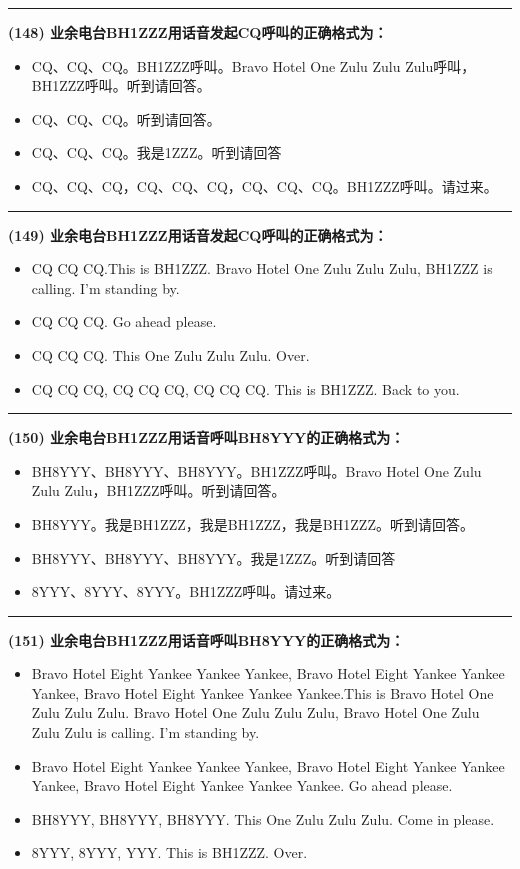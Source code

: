 \documentclass[twocolumn]{ctexart}  %
\begin{document}
\noindent\rule{0.5\textwidth}{1pt}
\heiti \textbf{(148) 业余电台BH1ZZZ用话音发起CQ呼叫的正确格式为：} \songti {\color{gray} [LK0238] }
\begin{itemize}
	\item  CQ、CQ、CQ。BH1ZZZ呼叫。Bravo Hotel One Zulu Zulu Zulu呼叫，BH1ZZZ呼叫。听到请回答。
	\item  CQ、CQ、CQ。听到请回答。
	\item  CQ、CQ、CQ。我是1ZZZ。听到请回答
	\item  CQ、CQ、CQ，CQ、CQ、CQ，CQ、CQ、CQ。BH1ZZZ呼叫。请过来。
\end{itemize}


\noindent\rule{0.5\textwidth}{1pt}
\heiti \textbf{(149) 业余电台BH1ZZZ用话音发起CQ呼叫的正确格式为：} \songti {\color{gray} [LK0239] }
\begin{itemize}
	\item  CQ CQ CQ.This is BH1ZZZ. Bravo Hotel One Zulu Zulu Zulu, BH1ZZZ is calling. I’m standing by.
	\item  CQ CQ CQ. Go ahead please.
	\item  CQ CQ CQ. This One Zulu Zulu Zulu. Over.
	\item  CQ CQ CQ, CQ CQ CQ, CQ CQ CQ. This is BH1ZZZ. Back to you.
\end{itemize}


\noindent\rule{0.5\textwidth}{1pt}
\heiti \textbf{(150) 业余电台BH1ZZZ用话音呼叫BH8YYY的正确格式为：} \songti {\color{gray} [LK0241] }
\begin{itemize}
	\item  BH8YYY、BH8YYY、BH8YYY。BH1ZZZ呼叫。Bravo Hotel One Zulu Zulu Zulu，BH1ZZZ呼叫。听到请回答。
	\item  BH8YYY。我是BH1ZZZ，我是BH1ZZZ，我是BH1ZZZ。听到请回答。
	\item  BH8YYY、BH8YYY、BH8YYY。我是1ZZZ。听到请回答
	\item  8YYY、8YYY、8YYY。BH1ZZZ呼叫。请过来。
\end{itemize}


\noindent\rule{0.5\textwidth}{1pt}
\heiti \textbf{(151) 业余电台BH1ZZZ用话音呼叫BH8YYY的正确格式为：} \songti {\color{gray} [LK0242] }
\begin{itemize}
	\item  Bravo Hotel Eight Yankee Yankee Yankee, Bravo Hotel Eight Yankee Yankee Yankee, Bravo Hotel Eight Yankee Yankee Yankee.This is Bravo Hotel One Zulu Zulu Zulu. Bravo Hotel One Zulu Zulu Zulu, Bravo Hotel One Zulu Zulu Zulu is calling. I’m standing by.
	\item  Bravo Hotel Eight Yankee Yankee Yankee, Bravo Hotel Eight Yankee Yankee Yankee, Bravo Hotel Eight Yankee Yankee Yankee. Go ahead please.
	\item  BH8YYY, BH8YYY, BH8YYY. This One Zulu Zulu Zulu. Come in please.
	\item  8YYY, 8YYY, YYY. This is BH1ZZZ. Over.
\end{itemize}
\end{document}
